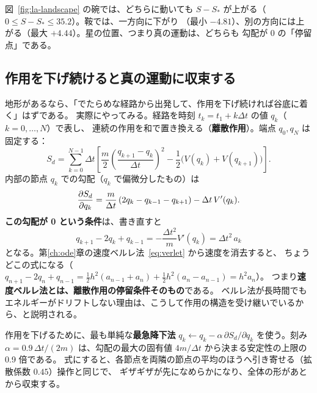 
図~\ref{fig:la-landscape} の碗では、どちらに動いても $S-S_*$ が上がる（$0\le S-S_*\le35.2$）。鞍では、一方向に下がり
（最小 $-4.81$）、別の方向には上がる（最大 $+4.44$）。星の位置、つまり真の運動は、どちらも
勾配が 0 の「停留点」である。

\subsection{作用を下げ続けると真の運動に収束する}\label{sec:eom-relax}

地形があるなら、「でたらめな経路から出発して、作用を下げ続ければ谷底に着く」はずである。
実際にやってみる。経路を時刻 $t_k=t_1+k\Delta t$ の値 $q_k$（$k=0,\dots,N$）で表し、
連続の作用を和で置き換える（\textbf{離散作用}）。端点 $q_0,q_N$ は固定する：
\begin{equation}
  S_d=\sum_{k=0}^{N-1}\Delta t\left[\frac m2\left(\frac{q_{k+1}-q_k}{\Delta t}\right)^2
  -\frac12\bigl(V(q_k)+V(q_{k+1})\bigr)\right].
\end{equation}
内部の節点 $q_k$ での勾配（$q_k$ で偏微分したもの）は
\begin{equation}
  \frac{\partial S_d}{\partial q_k}=\frac m{\Delta t}\,(2q_k-q_{k-1}-q_{k+1})-\Delta t\,V'(q_k).
\end{equation}
\textbf{この勾配が 0 という条件}は、書き直すと
\begin{equation}
  q_{k+1}-2q_k+q_{k-1}=-\frac{\Delta t^2}{m}V'(q_k)=\Delta t^2\,a_k
  \label{eq:verlet-position}
\end{equation}
となる。第\ref{ch:ode}章の速度ベルレ法~\eqref{eq:verlet} から速度を消去すると、
ちょうどこの式になる（$q_{n+1}-2q_n+q_{n-1}=\tfrac12h^2(a_{n-1}+a_n)+\tfrac12h^2(a_n-a_{n-1})=h^2a_n$）。
つまり\textbf{速度ベルレ法とは、離散作用の停留条件そのもの}である。
ベルレ法が長時間でもエネルギーがドリフトしない理由は、こうして作用の構造を受け継いでいるから、と説明される。

作用を下げるために、最も単純な\textbf{最急降下法} $q_k\leftarrow q_k-\alpha\,\partial S_d/\partial q_k$
を使う。刻み $\alpha=0.9\,\Delta t/(2m)$ は、勾配の最大の固有値 $4m/\Delta t$ から決まる安定性の上限の 0.9 倍である。
式にすると、各節点を両隣の節点の平均のほうへ引き寄せる（拡散係数 $0.45$）操作と同じで、
ギザギザが先になめらかになり、全体の形があとから収束する。


